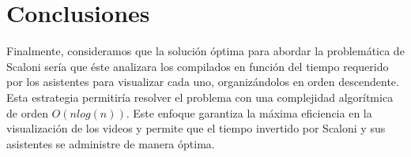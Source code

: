 \section{Conclusiones}

Finalmente, consideramos que la solución óptima para abordar la problemática de Scaloni sería que
éste analizara los compilados en función del tiempo requerido por los asistentes para visualizar
cada uno, organizándolos en orden descendente.
Esta estrategia permitiría resolver el problema con una complejidad algorítmica de orden 
$O(n log(n))$.
Este enfoque garantiza la máxima eficiencia en la visualización de los videos y permite que el 
tiempo invertido por Scaloni y sus asistentes se administre de manera óptima.
